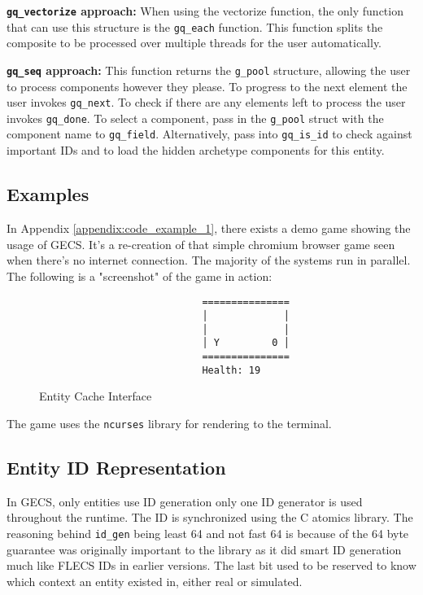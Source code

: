 \textbf{\texttt{gq\_vectorize} approach:} When using the vectorize function, the only function that can use this structure is the \texttt{gq\_each} function. This function splits the composite to be processed over multiple threads for the user automatically.

\textbf{\texttt{gq\_seq} approach:} This function returns the \texttt{g\_pool} structure, allowing the user to process components however they please. To progress to the next element the user invokes \texttt{gq\_next}. To check if there are any elements left to process the user invokes \texttt{gq\_done}. 
To select a component, pass in the \texttt{g\_pool} struct with the component name to \texttt{gq\_field}. Alternatively, pass into \texttt{gq\_is\_id} to check against important IDs and to load the hidden archetype components for this entity. 

\subsection{Examples}
In Appendix \ref{appendix:code_example_1}, there exists a demo game showing the usage of GECS. It's a re-creation of that simple chromium browser game seen when there's no internet connection. The majority of the systems run in parallel. The following is a "screenshot" of the game in action:

\begin{figure}[H]
    \begin{verbatim}
                            ===============
                            │             │
                            │             │
                            │ Y         0 │
                            ===============
                            Health: 19
    \end{verbatim}
\caption{Entity Cache Interface}
\label{code:demo_game}
\end{figure}

The game uses the \texttt{ncurses} library for rendering to the terminal. 

\subsection{Entity ID Representation}
In GECS, only entities use ID generation only one ID generator is used throughout the runtime. The ID is synchronized using the C atomics library. The reasoning behind \texttt{id\_gen} being least 64 and not fast 64 is because of the 64 byte guarantee was originally important to the library as it did smart ID generation much like FLECS IDs in earlier versions. The last bit used to be reserved to know which context an entity existed in, either real or simulated. 

